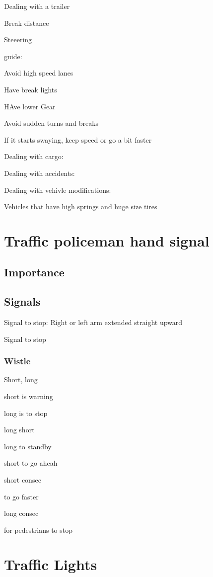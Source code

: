 \documentclass[openany]{book}
\begin{document}
Dealing with a trailer

Break distance

Steeering

guide:

Avoid high speed lanes

Have break lights

HAve lower Gear

Avoid sudden turns and breaks

If it starts swaying, keep speed or go a bit faster


Dealing with cargo:

Dealing with accidents:

Dealing with vehivle modifications:

Vehicles that have high springs and huge size tires

\chapter{Traffic policeman hand signal}

\section{Importance}

\section{Signals}

Signal to stop:
Right or left arm extended straight upward

Signal to stop

\subsection{Wistle}

Short, long

short is warning

long is to stop

long short

long to standby

short to go aheah

short consec

to go faster

long consec

for pedestrians to stop

\chapter{Traffic Lights}
\end{document}
